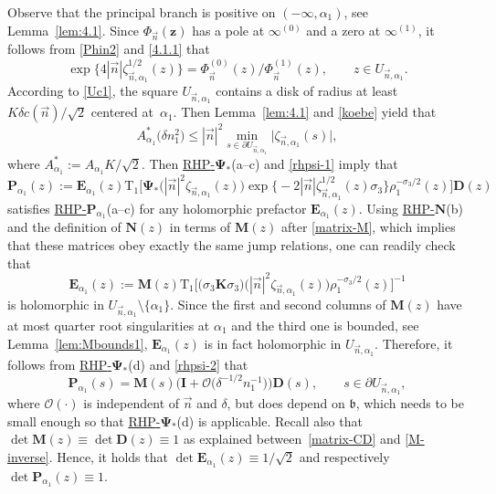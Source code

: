 \documentclass[pdftex]{sigma}
\numberwithin{equation}{section}
\renewcommand{\det}{\operatorname{det}}
\newcommand{\n}{{\vec n}}
\newcommand{\rhn} {\textnormal{RHP}-${\boldsymbol N}$}
\newcommand{\rhp} {\textnormal{RHP}-${\boldsymbol P}$}
\newcommand{\rhwpsi} {\textnormal{RHP}-${\boldsymbol \Psi_*}$}
\newcommand{\z}	{{\boldsymbol z}}
\begin{document}
Observe that the principal branch \smash{$ \zeta_{\n,\alpha_1}^{1/2}(z) $} is positive on $ (-\infty,\alpha_1) $, see Lemma~\ref{lem:4.1}. Since $ \Phi_\n(\z) $ has a pole at $ \infty^{(0)} $ and a zero at $ \infty^{(1)} $, it follows from \eqref{Phin2} and \eqref{4.1.1} that
\begin{equation}
\label{rhpsi-1}
\exp\bigl\{4|\n|\zeta_{\n,\alpha_1}^{1/2}(z) \bigr\} = \Phi_\n^{(0)}(z)/\Phi_\n^{(1)}(z), \qquad z\in U_{\n,\alpha_1}.
\end{equation}
According to \eqref{Uc1}, the square $ U_{\n,\alpha_1} $ contains a disk of radius at least $ K\delta c(\n)/\sqrt 2 $ centered at~$ \alpha_1 $. Then Lemma~\ref{lem:4.1} and \eqref{koebe} yield that
\begin{equation}
\label{rhpsi-2}
 A_{\alpha_1}^* \bigl(\delta n_1^2\bigr) \leq |\n|^2 \min_{s\in\partial U_{\n,\alpha_1}}\big|\zeta_{\n,\alpha_1}(s)\big|,
\end{equation}
where $A_{\alpha_1}^*:=A_{\alpha_1}K/\sqrt 2$. Then \hyperref[rhwpsi]{\rhwpsi}(a--c) and \eqref{rhpsi-1} imply that
\begin{equation}
\label{rhpsi-3}
\boldsymbol P_{\alpha_1}(z) := \boldsymbol E_{\alpha_1}(z) \mathrm{T}_1 \big[ \boldsymbol\Psi_* \bigl(|\n|^2\zeta_{\n,\alpha_1}(z)\bigr) \exp\bigl\{-2|\n|\zeta_{\n,\alpha_1}^{1/2}(z) \sigma_3\bigr\} \rho_1^{-\sigma_3/2}(z) \big] \boldsymbol D(z)
\end{equation}
satisfies \hyperref[rhp]{\rhp$_{\alpha_1}$}(a--c) for any holomorphic prefactor $\boldsymbol E_{\alpha_1}(z)$. Using \hyperref[rhn]{\rhn}(b) and the definition of $ \boldsymbol N(z) $ in terms of $ \boldsymbol M(z) $ after \eqref{matrix-M}, which implies that these matrices obey exactly the same jump relations, one can readily check that
\begin{equation}
\label{rhpsi-4}
\boldsymbol E_{\alpha_1}(z) := \boldsymbol M(z)\mathrm{T}_1\big[ \bigl(\sigma_3\boldsymbol K\sigma_3\bigr) \bigl(|\n|^2\zeta_{\n,\alpha_1}(z)\bigr) \rho_1^{-\sigma_3/2}(z)\big]^{-1}
\end{equation}
is holomorphic in $U_{\n,\alpha_1}\setminus\{\alpha_1\}$. Since the first and second columns of $\boldsymbol M(z)$ have at most quarter root singularities at $ \alpha_1 $ and the third one is bounded, see Lemma~\ref{lem:Mbounds1}, $\boldsymbol E_{\alpha_1}(z)$ is in fact holomorphic in $U_{\n,\alpha_1}$. Therefore, it follows from \hyperref[rhwpsi]{\rhwpsi}(d) and \eqref{rhpsi-2} that
\[%
\boldsymbol P_{\alpha_1}(s)= \boldsymbol M(s) \bigl( \boldsymbol I + \boldsymbol{\mathcal O}\bigl(\delta^{-1/2} n_1^{-1} \bigr) \bigr) \boldsymbol D(s), \qquad s\in \partial U_{\n,\alpha_1},
\]
where $\boldsymbol{\mathcal O}(\cdot) $ is independent of $ \n $ and $ \delta $, but does depend on $ \mathfrak b $, which needs to be small enough so that \hyperref[rhwpsi]{\rhwpsi}(d) is applicable. Recall also that $ \det \boldsymbol M(z) \equiv \det \boldsymbol D(z) \equiv 1 $ as explained between~\eqref{matrix-CD} and \eqref{M-inverse}. Hence, it holds that $ \det \boldsymbol E_{\alpha_1}(z) \equiv 1/\sqrt2 $ and respectively $ {\det \boldsymbol P_{\alpha_1}(z)\equiv 1 }$.
\end{document}
